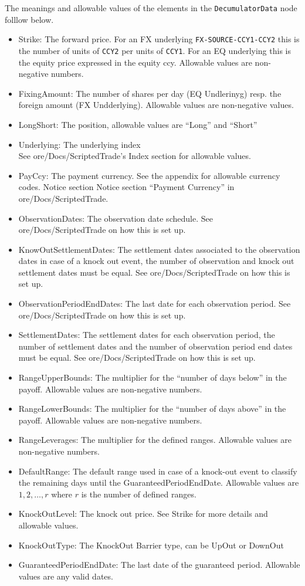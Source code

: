 The meanings and allowable values of the elements in the \verb+DecumulatorData+ node folllow below.

\begin{itemize}
\item Strike: The forward price. For an FX underlying \lstinline!FX-SOURCE-CCY1-CCY2! this is the number of units of \lstinline!CCY2! per units
  of \lstinline!CCY1!. For an EQ underlying this is the equity price expressed in the equity ccy.  Allowable values are non-negative
  numbers.
\item FixingAmount: The number of shares per day (EQ Undlerinyg) resp. the foreign amount (FX Undderlying). Allowable values
  are non-negative values.
\item LongShort: The position, allowable values are ``Long'' and ``Short''
\item Underlying:  The underlying index \\
  See ore/Docs/ScriptedTrade's Index section for allowable values.
\item PayCcy: The payment currency. See the appendix for allowable currency codes.  Notice section Notice section ``Payment Currency'' in ore/Docs/ScriptedTrade.
\item ObservationDates: The observation date schedule. See ore/Docs/ScriptedTrade on how this is set up.
\item KnowOutSettlementDates: The settlement dates associated to the observation dates in case of a knock out event, the
  number of observation and knock out settlement dates must be equal. See ore/Docs/ScriptedTrade on how this is
  set up.
\item ObservationPeriodEndDates: The last date for each observation period. See ore/Docs/ScriptedTrade on how
  this is set up.
\item SettlementDates: The settlement dates for each observation period, the number of settlement dates and the number
  of observation period end dates must be equal. See ore/Docs/ScriptedTrade on how this is set up.
\item RangeUpperBounds: The multiplier for the ``number of days below'' in the payoff. Allowable values are non-negative numbers.
\item RangeLowerBounds: The multiplier for the ``number of days above'' in the payoff. Allowable values are non-negative numbers.
\item RangeLeverages: The multiplier for the defined ranges. Allowable values are non-negative numbers.
\item DefaultRange: The default range used in case of a knock-out event to classify the remaining days until the
  GuaranteedPeriodEndDate. Allowable values are $1,2,\ldots,r$ where $r$ is the number of defined ranges.
\item KnockOutLevel: The knock out price. See Strike for more details and allowable values.
\item KnockOutType: The KnockOut Barrier type, can be UpOut or DownOut
\item GuaranteedPeriodEndDate: The last date of the guaranteed period. Allowable values are any valid dates.
\end{itemize}

